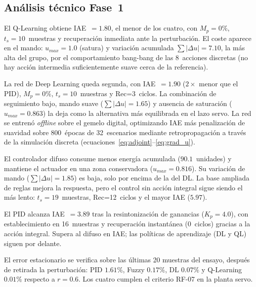 



\subsection*{Análisis técnico Fase~1}

El Q-Learning obtiene IAE~$=1.80$, el menor de los cuatro, con $M_p=0\%$, $t_s=10$~muestras y recuperación inmediata ante la perturbación. El coste aparece en el mando: $u_{max}=1.0$ (satura) y variación acumulada $\sum|\Delta u|=7.10$, la más alta del grupo, por el comportamiento bang-bang de las 8~acciones discretas (no hay acción intermedia suficientemente suave cerca de la referencia).

La red de Deep Learning queda segunda, con IAE~$=1.90$ ($2\times$ menor que el PID), $M_p=0\%$, $t_s=10$~muestras y Rec=3~ciclos. La combinación de seguimiento bajo, mando suave ($\sum|\Delta u|=1.65$) y ausencia de saturación ($u_{max}=0.863$) la deja como la alternativa más equilibrada en el lazo servo. La red se entrenó \emph{offline} sobre el gemelo digital, optimizando IAE más penalización de suavidad sobre 800~épocas de 32~escenarios mediante retropropagación a través de la simulación discreta (ecuaciones~\ref{eq:adjoint}--\ref{eq:grad_u}).

El controlador difuso consume menos energía acumulada ($90.1$~unidades) y mantiene el actuador en una zona conservadora ($u_{max}=0.816$). Su variación de mando ($\sum|\Delta u|=1.85$) es baja, solo por encima de la del DL. La base ampliada de reglas mejora la respuesta, pero el control sin acción integral sigue siendo el más lento: $t_s=19$~muestras, Rec=12~ciclos y el mayor IAE ($5.97$).

El PID alcanza IAE~$=3.89$ tras la resintonización de ganancias ($K_p=4.0$), con establecimiento en 16~muestras y recuperación instantánea ($0$~ciclos) gracias a la acción integral. Supera al difuso en IAE; las políticas de aprendizaje (DL y QL) siguen por delante.

El error estacionario se verifica sobre las últimas 20 muestras del ensayo, después de retirada la perturbación: PID $1.61\%$, Fuzzy $0.17\%$, DL $0.07\%$ y Q-Learning $0.01\%$ respecto a $r=0.6$. Los cuatro cumplen el criterio RF-07 en la planta servo.

